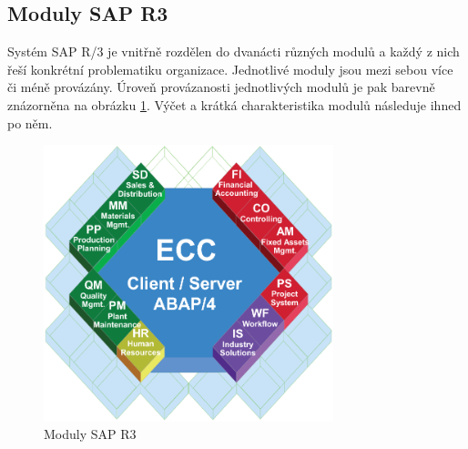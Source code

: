 \documentclass[thesis=M,czech]{FITthesis}[2012/06/26]
\begin{document}
\subsection{Moduly SAP R3}
Systém SAP R/3 je vnitřně rozdělen do dvanácti různých modulů a každý z nich řeší konkrétní problematiku organizace. Jednotlivé moduly jsou mezi sebou více či méně provázány. Úroveň provázanosti jednotlivých modulů je pak barevně znázorněna na obrázku \ref{img:sapr3}. Výčet a krátká charakteristika modulů následuje ihned po něm.

\begin{figure}[H]
	\centering
	\includegraphics[width=0.75\textwidth]{images/sap_r3}
	\caption{Moduly SAP R3 \cite{sap_r3_modules}}
	\label{img:sapr3}
\end{figure}
\end{document}
